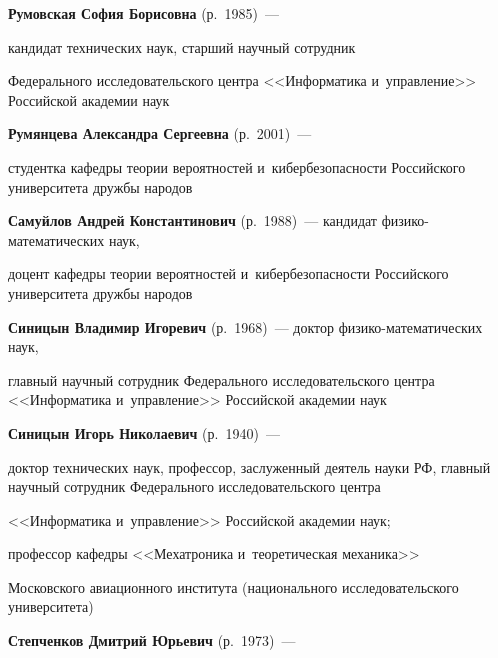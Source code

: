\noindent


\textbf{Румовская София Борисовна} (р.\ 1985)~--- 


кандидат технических наук, старший научный сотрудник %


Федерального исследовательского цент\-ра <<Информатика и~управ\-ле\-ние>> Российской академии наук





\noindent


\textbf{Румянцева Александра Сергеевна} (р.\ 2001)~--- 


студентка кафедры тео\-рии вероятностей и~ки\-бер\-безопас\-ности Российского университета друж\-бы народов





\noindent


\textbf{Самуйлов Андрей Константинович} (р.\ 1988)~--- кандидат фи\-зи\-ко-ма\-те\-ма\-ти\-че\-ских наук, 


доцент ка\-фед\-ры тео\-рии вероятностей и~ки\-бер\-безопас\-ности Российского университета друж\-бы народов





\noindent


\textbf{Синицын Владимир Игоревич} (р.\ 1968)~--- доктор фи\-зи\-ко-ма\-те\-ма\-ти\-че\-ских наук, 


главный научный сотрудник Федерального исследовательского цент\-ра <<Информатика и~управ\-ле\-ние>> Российской академии наук





\noindent


\textbf{Синицын Игорь Николаевич} (р.\ 1940)~--- 


доктор технических наук, профессор, заслуженный деятель науки РФ, главный научный сотрудник Федерального исследовательского центра 


<<Информатика и~управ\-ле\-ние>> Российской академии наук;


профессор кафедры <<Мехатроника и~тео\-ре\-ти\-че\-ская механика>> 


Московского авиационного института (национального исследовательского университета)





\noindent


\textbf{Степченков Дмитрий Юрьевич} (р.\ 1973)~--- 


